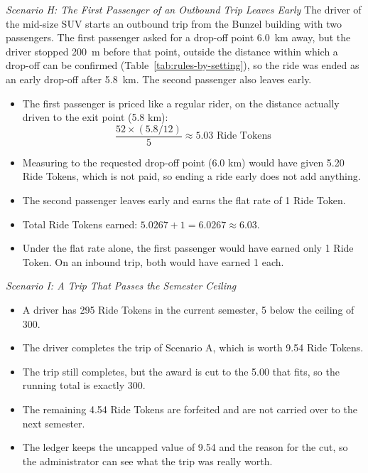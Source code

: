 \vspace{1em}
\noindent\textit{Scenario H: The First Passenger of an Outbound Trip Leaves Early}
The driver of the mid-size SUV starts an outbound trip from the Bunzel building with two passengers. The first passenger asked for a drop-off point 6.0~km away, but the driver stopped 200~m before that point, outside the distance within which a drop-off can be confirmed (Table~\ref{tab:rules-by-setting}), so the ride was ended as an early drop-off after 5.8~km. The second passenger also leaves early.
\begin{itemize}
    \item The first passenger is priced like a regular rider, on the distance actually driven to the exit point (5.8 km):
    \[
    \frac{52 \times (5.8/12)}{5} \approx 5.03 \text{ Ride Tokens}
    \]
    \item Measuring to the requested drop-off point (6.0 km) would have given 5.20 Ride Tokens, which is not paid, so ending a ride early does not add anything.
    \item The second passenger leaves early and earns the flat rate of 1 Ride Token.
    \item Total Ride Tokens earned: $5.0267 + 1 = 6.0267 \approx 6.03$.
    \item Under the flat rate alone, the first passenger would have earned only 1 Ride Token. On an inbound trip, both would have earned 1 each.
\end{itemize}

\vspace{1em}
\noindent\textit{Scenario I: A Trip That Passes the Semester Ceiling}
\begin{itemize}
    \item A driver has 295 Ride Tokens in the current semester, 5 below the ceiling of 300.
    \item The driver completes the trip of Scenario A, which is worth 9.54 Ride Tokens.
    \item The trip still completes, but the award is cut to the 5.00 that fits, so the running total is exactly 300.
    \item The remaining 4.54 Ride Tokens are forfeited and are not carried over to the next semester.
    \item The ledger keeps the uncapped value of 9.54 and the reason for the cut, so the administrator can see what the trip was really worth.
\end{itemize}

